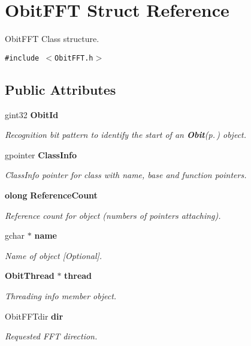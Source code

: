\section{Obit\-FFT Struct Reference}
\label{structObitFFT}
Obit\-FFT Class structure.  


{\tt \#include $<$Obit\-FFT.h$>$}

\subsection*{Public Attributes}
\begin{CompactItemize}
\item 
gint32 {\bf Obit\-Id}
\begin{CompactList}\small\item\em Recognition bit pattern to identify the start of an {\bf Obit}{\rm (p.\,\pageref{structObit})} object. \item\end{CompactList}\item 
gpointer {\bf Class\-Info}
\begin{CompactList}\small\item\em Class\-Info pointer for class with name, base and function pointers. \item\end{CompactList}\item 
{\bf olong} {\bf Reference\-Count}
\begin{CompactList}\small\item\em Reference count for object (numbers of pointers attaching). \item\end{CompactList}\item 
gchar $\ast$ {\bf name}
\begin{CompactList}\small\item\em Name of object [Optional]. \item\end{CompactList}\item 
{\bf Obit\-Thread} $\ast$ {\bf thread}
\begin{CompactList}\small\item\em Threading info member object. \item\end{CompactList}\item 
Obit\-FFTdir {\bf dir}
\begin{CompactList}\small\item\em Requested FFT direction. \item\end{CompactList}\item 

\end{CompactItemize}
